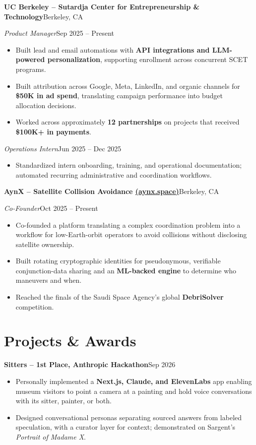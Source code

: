\documentclass[a4paper,10pt]{article}
\newcommand{\entry}[4]{%
  \textbf{#1}\hfill #2\par
  \textit{#3}\hfill #4\par
}
\newcommand{\project}[2]{\textbf{#1}\hfill #2\par}
\begin{document}
\entry
{UC Berkeley -- Sutardja Center for Entrepreneurship \& Technology}
{Berkeley, CA}
{Product Manager}
{Sep 2025 -- Present}
\begin{itemize}
  \item Built lead and email automations with
  \textbf{API integrations and LLM-powered personalization},
  supporting enrollment across concurrent SCET programs.
  \item Built attribution across Google, Meta, LinkedIn, and organic
  channels for \textbf{\$50K in ad spend}, translating campaign
  performance into budget allocation decisions.
  \item Worked across approximately \textbf{12 partnerships} on
  projects that received \textbf{\$100K+ in payments}.
\end{itemize}

\textit{Operations Intern}\hfill Jun 2025 -- Dec 2025\par
\begin{itemize}
  \item Standardized intern onboarding, training, and operational
  documentation; automated recurring administrative and coordination
  workflows.
\end{itemize}

\entry
{AynX -- Satellite Collision Avoidance
  \;\href{https://aynx.space}{(aynx.space)}}
{Berkeley, CA}
{Co-Founder}
{Oct 2025 -- Present}
\begin{itemize}
  \item Co-founded a platform translating a complex coordination
  problem into a workflow for low-Earth-orbit operators to avoid
  collisions without disclosing satellite ownership.
  \item Built rotating cryptographic identities for pseudonymous,
  verifiable conjunction-data sharing and an \textbf{ML-backed engine}
  to determine who maneuvers and when.
  \item Reached the finals of the Saudi Space Agency's global
  \textbf{DebriSolver} competition.
\end{itemize}

\section{Projects \& Awards}

\project{Sitters -- 1st Place, Anthropic Hackathon}{Sep 2026}
\begin{itemize}
  \item Personally implemented a \textbf{Next.js, Claude, and ElevenLabs}
  app enabling museum visitors to point a camera at a painting and
  hold voice conversations with its sitter, painter, or both.
  \item Designed conversational personas separating sourced answers
  from labeled speculation, with a curator layer for context;
  demonstrated on Sargent's \textit{Portrait of Madame X}.
\end{itemize}
\end{document}
